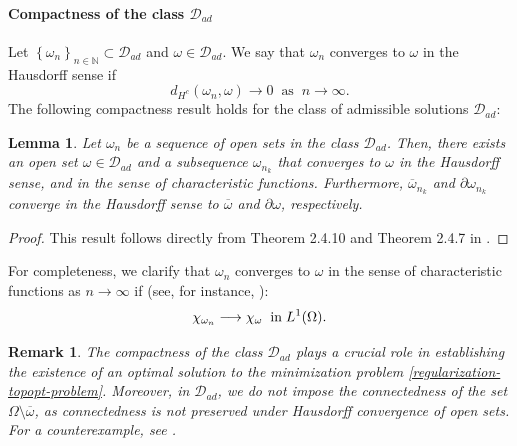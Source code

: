 \documentclass[a4paper,12pt,reqno,natbib]{amsart}
\newtheorem{lemma}[theorem]{Lemma}
\newtheorem{remark}[theorem]{Remark}
\begin{document}
\paragraph{\bf Compactness of the class $\mathcal{D}_{ad}$} Let $\left\{\omega_n\right\}_{n \in \mathbb{N}}\subset\mathcal{D}_{ad}$  and $\omega\in\mathcal{D}_{ad}$. We say that $\omega_n$ converges to $\omega$ in the Hausdorff sense if
$$d_{H^c}(\omega_n,\omega)\to0\;\; \text{as}\;\; n\to\infty.$$
The following compactness result holds for the class of admissible solutions $\mathcal{D}_{ad}$:
\begin{lemma}\label{compacteness-D-ad}Let $\omega_n$ be a sequence of open sets in the class $\mathcal{D}_{ad}$. Then, there exists an open set 
$\omega \in\mathcal{D}_{ad}$ and a subsequence $\omega_{n_k}$ that converges to $\omega$ in the Hausdorff sense, and in the sense of characteristic functions. Furthermore,  $\overline{\omega}_{n_k}$ and $\partial \omega_{n_k}$ converge in the Hausdorff sense to $\overline{\omega}$ and $\partial \omega$, respectively.
\end{lemma}

\begin{proof}
   This result follows directly from Theorem 2.4.10 and Theorem 2.4.7 in \cite{HenrotBook2006}.
\end{proof}


For completeness, we clarify that $\omega_n$ converges to $\omega$ in the sense of characteristic functions as $n \to \infty$ if (see, for instance, \cite[Definition 2.2.3]{HenrotBook2005}):
$$
\chi_{\omega_n}\longrightarrow\chi_{\omega}\;\;\hbox{in}\; L^1(\Omega).
$$

\begin{remark} \label{rem-jus}
The compactness of the class $\mathcal{D}_{ad}$ plays a crucial role in establishing the existence of an optimal solution to the minimization problem \eqref{regularization-topopt-problem}. Moreover, in $\mathcal{D}_{ad}$, we do not impose the connectedness of the set $\Omega \setminus \overline{\omega}$, as connectedness is not preserved under Hausdorff convergence of open sets. For a counterexample, see \cite[p. 33]{HenrotBook2005}.
\end{remark}



\vspace{0.4cm}
\end{document}
